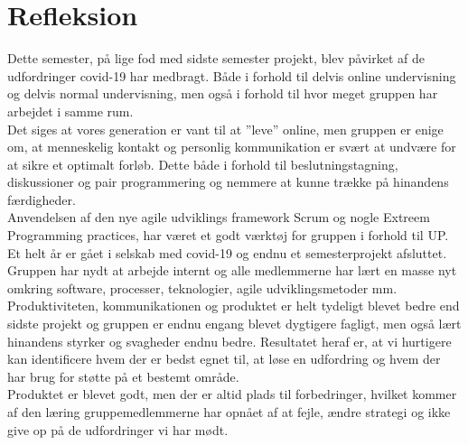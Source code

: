 \chapter{Refleksion}\label{ch:refleksion}
Dette semester, på lige fod med sidste semester projekt, blev påvirket af de udfordringer covid-19 har medbragt.
Både i forhold til delvis online undervisning og delvis normal undervisning, 
men også i forhold til hvor meget gruppen har arbejdet i samme rum. \\

Det siges at vores generation er vant til at ”leve” online, men gruppen er enige om, 
at menneskelig kontakt og personlig kommunikation er svært at undvære for at sikre et optimalt forløb. 
Dette både i forhold til beslutningstagning, diskussioner og pair programmering og 
nemmere at kunne trække på hinandens færdigheder. \\

Anvendelsen af den nye agile udviklings framework Scrum og nogle Extreem Programming practices, 
har været et godt værktøj for gruppen i forhold til UP. \\

Et helt år er gået i selskab med covid-19 og endnu et semesterprojekt afsluttet. 
Gruppen har nydt at arbejde internt og alle medlemmerne har lært en masse nyt 
omkring software, processer, teknologier, agile udviklingsmetoder mm. \\

Produktiviteten, kommunikationen og produktet er helt tydeligt blevet bedre end sidste 
projekt og gruppen er endnu engang blevet dygtigere fagligt, 
men også lært hinandens styrker og svagheder endnu bedre. Resultatet heraf er, 
at vi hurtigere kan identificere hvem der er bedst egnet til, 
at løse en udfordring og hvem der har brug for støtte på et bestemt område. \\

Produktet er blevet godt, men der er altid plads til forbedringer, 
hvilket kommer af den læring gruppemedlemmerne har opnået af at fejle, 
ændre strategi og ikke give op på de udfordringer vi har mødt.